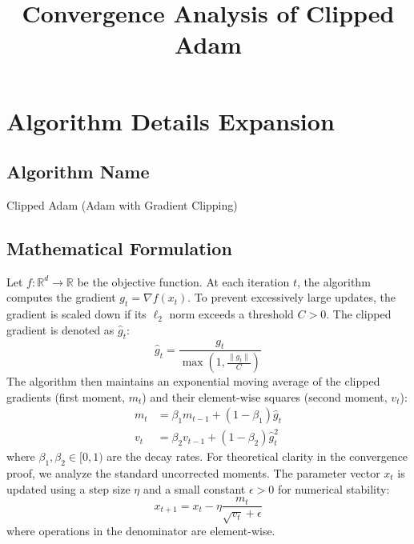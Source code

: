 \documentclass{article}
\title{Convergence Analysis of Clipped Adam}
\author{}
\date{}
\begin{document}
\maketitle

\section*{Algorithm Details Expansion}

\subsection*{Algorithm Name}
Clipped Adam (Adam with Gradient Clipping)

\subsection*{Mathematical Formulation}
Let $f: \mathbb{R}^d \to \mathbb{R}$ be the objective function. At each iteration $t$, the algorithm computes the gradient $g_t = \nabla f(x_t)$. To prevent excessively large updates, the gradient is scaled down if its $\ell_2$ norm exceeds a threshold $C > 0$. The clipped gradient is denoted as $\hat{g}_t$:
\begin{equation}
    \hat{g}_t = \frac{g_t}{\max\left(1, \frac{\|g_t\|}{C}\right)}
\end{equation}
The algorithm then maintains an exponential moving average of the clipped gradients (first moment, $m_t$) and their element-wise squares (second moment, $v_t$):
\begin{align}
    m_t &= \beta_1 m_{t-1} + (1 - \beta_1) \hat{g}_t \\
    v_t &= \beta_2 v_{t-1} + (1 - \beta_2) \hat{g}_t^2
\end{align}
where $\beta_1, \beta_2 \in [0, 1)$ are the decay rates. For theoretical clarity in the convergence proof, we analyze the standard uncorrected moments. The parameter vector $x_t$ is updated using a step size $\eta$ and a small constant $\epsilon > 0$ for numerical stability:
\begin{equation}
    x_{t+1} = x_t - \eta \frac{m_t}{\sqrt{v_t} + \epsilon}
\end{equation}
where operations in the denominator are element-wise. 
\end{document}

